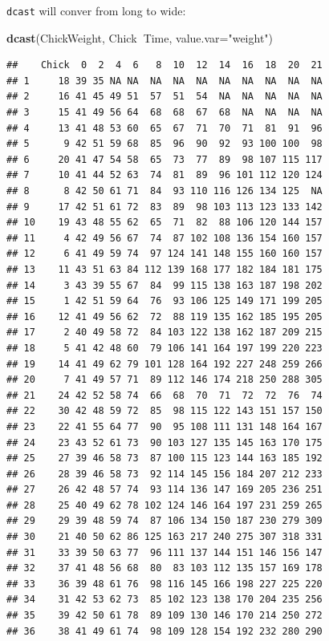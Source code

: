 \documentclass[]{book}
\newenvironment{Shaded}{\begin{snugshade}}{\end{snugshade}}
\newcommand{\KeywordTok}[1]{\textcolor[rgb]{0.13,0.29,0.53}{\textbf{#1}}}
\newcommand{\DataTypeTok}[1]{\textcolor[rgb]{0.13,0.29,0.53}{#1}}
\newcommand{\StringTok}[1]{\textcolor[rgb]{0.31,0.60,0.02}{#1}}
\newcommand{\OperatorTok}[1]{\textcolor[rgb]{0.81,0.36,0.00}{\textbf{#1}}}
\newcommand{\NormalTok}[1]{#1}
\theoremstyle{definition}
\theoremstyle{definition}
\theoremstyle{definition}
\theoremstyle{remark}
\begin{document}
\texttt{dcast} will conver from long to wide:

\begin{Shaded}
\begin{Highlighting}[]
\KeywordTok{dcast}\NormalTok{(ChickWeight, Chick}\OperatorTok{~}\NormalTok{Time, }\DataTypeTok{value.var=}\StringTok{"weight"}\NormalTok{)}
\end{Highlighting}
\end{Shaded}

\begin{verbatim}
##    Chick  0  2  4  6   8  10  12  14  16  18  20  21
## 1     18 39 35 NA NA  NA  NA  NA  NA  NA  NA  NA  NA
## 2     16 41 45 49 51  57  51  54  NA  NA  NA  NA  NA
## 3     15 41 49 56 64  68  68  67  68  NA  NA  NA  NA
## 4     13 41 48 53 60  65  67  71  70  71  81  91  96
## 5      9 42 51 59 68  85  96  90  92  93 100 100  98
## 6     20 41 47 54 58  65  73  77  89  98 107 115 117
## 7     10 41 44 52 63  74  81  89  96 101 112 120 124
## 8      8 42 50 61 71  84  93 110 116 126 134 125  NA
## 9     17 42 51 61 72  83  89  98 103 113 123 133 142
## 10    19 43 48 55 62  65  71  82  88 106 120 144 157
## 11     4 42 49 56 67  74  87 102 108 136 154 160 157
## 12     6 41 49 59 74  97 124 141 148 155 160 160 157
## 13    11 43 51 63 84 112 139 168 177 182 184 181 175
## 14     3 43 39 55 67  84  99 115 138 163 187 198 202
## 15     1 42 51 59 64  76  93 106 125 149 171 199 205
## 16    12 41 49 56 62  72  88 119 135 162 185 195 205
## 17     2 40 49 58 72  84 103 122 138 162 187 209 215
## 18     5 41 42 48 60  79 106 141 164 197 199 220 223
## 19    14 41 49 62 79 101 128 164 192 227 248 259 266
## 20     7 41 49 57 71  89 112 146 174 218 250 288 305
## 21    24 42 52 58 74  66  68  70  71  72  72  76  74
## 22    30 42 48 59 72  85  98 115 122 143 151 157 150
## 23    22 41 55 64 77  90  95 108 111 131 148 164 167
## 24    23 43 52 61 73  90 103 127 135 145 163 170 175
## 25    27 39 46 58 73  87 100 115 123 144 163 185 192
## 26    28 39 46 58 73  92 114 145 156 184 207 212 233
## 27    26 42 48 57 74  93 114 136 147 169 205 236 251
## 28    25 40 49 62 78 102 124 146 164 197 231 259 265
## 29    29 39 48 59 74  87 106 134 150 187 230 279 309
## 30    21 40 50 62 86 125 163 217 240 275 307 318 331
## 31    33 39 50 63 77  96 111 137 144 151 146 156 147
## 32    37 41 48 56 68  80  83 103 112 135 157 169 178
## 33    36 39 48 61 76  98 116 145 166 198 227 225 220
## 34    31 42 53 62 73  85 102 123 138 170 204 235 256
## 35    39 42 50 61 78  89 109 130 146 170 214 250 272
## 36    38 41 49 61 74  98 109 128 154 192 232 280 290

\end{verbatim}
\end{document}
